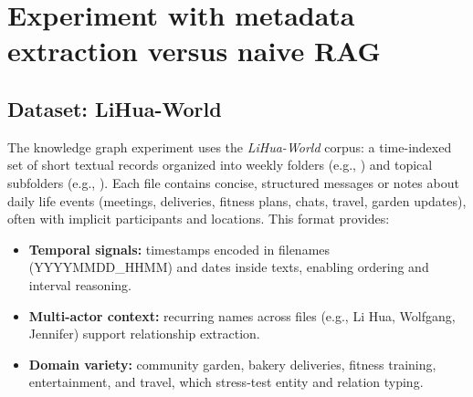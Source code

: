 \section{Experiment with metadata extraction versus naive RAG}
\subsection{Dataset: LiHua-World}
The knowledge graph experiment uses the \emph{LiHua-World} corpus: a time-indexed set of short textual records organized into weekly folders (e.g., ) and topical subfolders (e.g., ). Each file contains concise, structured messages or notes about daily life events (meetings, deliveries, fitness plans, chats, travel, garden updates), often with implicit participants and locations. This format provides:
\begin{itemize}
    \item \textbf{Temporal signals:} timestamps encoded in filenames (YYYYMMDD\_HHMM) and dates inside texts, enabling ordering and interval reasoning.
    \item \textbf{Multi-actor context:} recurring names across files (e.g., Li Hua, Wolfgang, Jennifer) support relationship extraction.
    \item \textbf{Domain variety:} community garden, bakery deliveries, fitness training, entertainment, and travel, which stress-test entity and relation typing.
\end{itemize}

